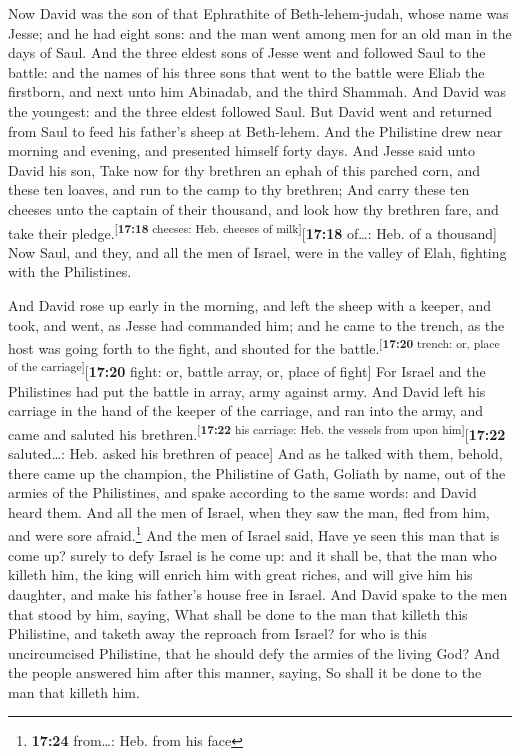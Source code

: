 Now David was the son of that Ephrathite of
Beth-lehem-judah, whose name was Jesse; and he had eight sons: and the
man went among men for an old man in the days of Saul. 
And the three eldest sons of Jesse went and followed Saul to the battle:
and the names of his three sons that went to the battle were Eliab the
firstborn, and next unto him Abinadab, and the third Shammah.
 And David was the youngest: and the three eldest
followed Saul.  But David went and returned from Saul to
feed his father's sheep at Beth-lehem.  And the
Philistine drew near morning and evening, and presented himself forty
days.  And Jesse said unto David his son, Take now for
thy brethren an ephah of this parched corn, and these ten loaves, and
run to the camp to thy brethren;  And carry these ten
cheeses unto the captain of their thousand, and look how thy brethren
fare, and take their pledge.\textsuperscript{{[}\textbf{17:18} cheeses:
Heb. cheeses of milk{]}}{[}\textbf{17:18} of\ldots: Heb. of a
thousand{]}  Now Saul, and they, and all the men of
Israel, were in the valley of Elah, fighting with the Philistines.

 And David rose up early in the morning, and left the
sheep with a keeper, and took, and went, as Jesse had commanded him; and
he came to the trench, as the host was going forth to the fight, and
shouted for the battle.\textsuperscript{{[}\textbf{17:20} trench: or,
place of the carriage{]}}{[}\textbf{17:20} fight: or, battle array, or,
place of fight{]}  For Israel and the Philistines had put
the battle in array, army against army.  And David left
his carriage in the hand of the keeper of the carriage, and ran into the
army, and came and saluted his
brethren.\textsuperscript{{[}\textbf{17:22} his carriage: Heb. the
vessels from upon him{]}}{[}\textbf{17:22} saluted\ldots: Heb. asked his
brethren of peace{]}  And as he talked with them, behold,
there came up the champion, the Philistine of Gath, Goliath by name, out
of the armies of the Philistines, and spake according to the same words:
and David heard them.  And all the men of Israel, when
they saw the man, fled from him, and were sore afraid.\footnote{\textbf{17:24}
  from\ldots: Heb. from his face}  And the men of Israel
said, Have ye seen this man that is come up? surely to defy Israel is he
come up: and it shall be, that the man who killeth him, the king will
enrich him with great riches, and will give him his daughter, and make
his father's house free in Israel.  And David spake to
the men that stood by him, saying, What shall be done to the man that
killeth this Philistine, and taketh away the reproach from Israel? for
who is this uncircumcised Philistine, that he should defy the armies of
the living God?  And the people answered him after this
manner, saying, So shall it be done to the man that killeth him.

